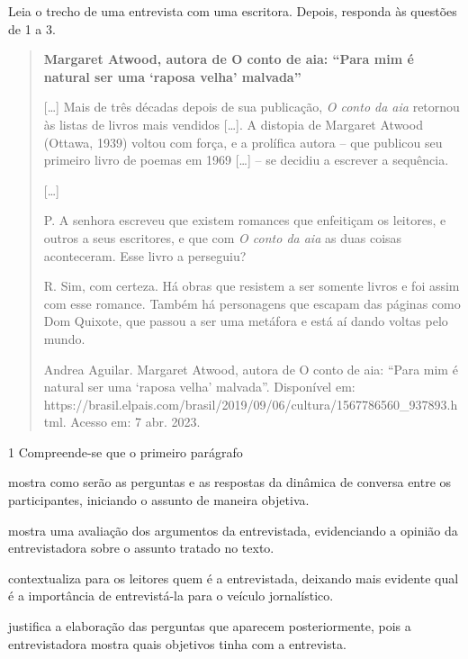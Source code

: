 
Leia o trecho de uma entrevista com uma escritora. Depois, responda às
questões de 1 a 3.

\begin{quote}
\textbf{Margaret Atwood, autora de O conto de aia: ``Para mim é natural
ser uma `raposa velha' malvada''}

{[}\ldots{}{]} Mais de três décadas depois de sua publicação, \emph{O
conto da aia} retornou às listas de livros mais vendidos {[}\ldots{}{]}.
A distopia de Margaret Atwood (Ottawa, 1939) voltou com força, e a
prolífica autora -- que publicou seu primeiro livro de poemas em 1969
{[}\ldots{}{]} -- se decidiu a escrever a sequência.

{[}\ldots{}{]}

P. A senhora escreveu que existem romances que enfeitiçam os leitores, e
outros a seus escritores, e que com \emph{O conto da aia} as duas coisas
aconteceram. Esse livro a perseguiu?

R. Sim, com certeza. Há obras que resistem a ser somente livros e foi
assim com esse romance. Também há personagens que escapam das páginas
como Dom Quixote, que passou a ser uma metáfora e está aí dando voltas
pelo mundo.

Andrea Aguilar. Margaret Atwood, autora de O conto de aia: ``Para mim é
natural ser uma `raposa velha' malvada''. Disponível em:
https://brasil.elpais.com/brasil/2019/09/06/cultura/1567786560\_937893.html.
Acesso em: 7 abr. 2023.
\end{quote}

\num{1} Compreende-se que o primeiro parágrafo

\begin{escolha}
\item mostra como serão as perguntas e as respostas da dinâmica de
conversa entre os participantes, iniciando o assunto de maneira
objetiva.

\item mostra uma avaliação dos argumentos da entrevistada, evidenciando a
opinião da entrevistadora sobre o assunto tratado no texto.

\item contextualiza para os leitores quem é a entrevistada, deixando mais
evidente qual é a importância de entrevistá-la para o veículo
jornalístico.

\item justifica a elaboração das perguntas que aparecem posteriormente,
pois a entrevistadora mostra quais objetivos tinha com a entrevista.
\end{escolha}

